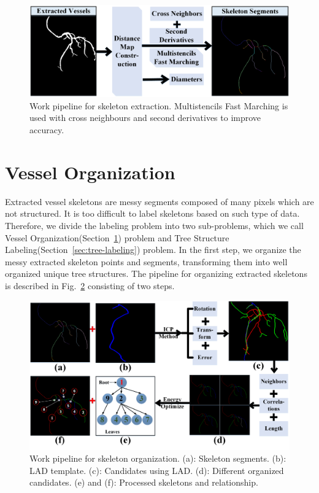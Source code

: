 \documentclass[journal]{IEEEtran}
\begin{document}
\begin{figure}[!t]
\centering
\includegraphics[width=1.0\linewidth]{./images/basis2-pipeline.png}
\caption{Work pipeline for skeleton extraction. Multistencils Fast Marching is used with cross neighbours and second derivatives to improve accuracy.}
\label{fig:skel_extraction}
\end{figure}

\section{Vessel Organization}
\label{sec:vessel-organization}
Extracted vessel skeletons are messy segments composed of many pixels which are not structured. It is too difficult to label skeletons based on such type of data. Therefore, we divide the labeling problem into two sub-problems, which we call Vessel Organization(Section~\ref{sec:vessel-organization}) problem and Tree Structure Labeling(Section~\ref{sec:tree-labeling}) problem. In the first step, we organize the messy extracted skeleton points and segments, transforming them into well organized unique tree structures. The pipeline for organizing extracted skeletons is described in Fig.~\ref{fig:skel_organization} consisting of two steps.

\begin{figure}[!t]
\centering
\includegraphics[width=1.0\linewidth]{./images/skel-orga-pipeline.png}
\caption{Work pipeline for skeleton organization. (a): Skeleton segments. (b): LAD template. (c): Candidates using LAD. (d): Different organized candidates. (e) and (f): Processed skeletons and relationship.}
\label{fig:skel_organization}
\end{figure}
\end{document}
